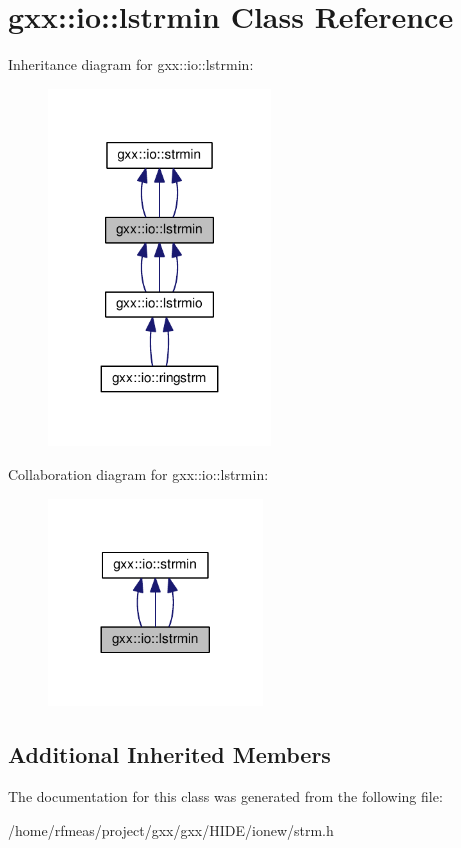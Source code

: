 \hypertarget{classgxx_1_1io_1_1lstrmin}{}\section{gxx\+:\+:io\+:\+:lstrmin Class Reference}
\label{classgxx_1_1io_1_1lstrmin}


Inheritance diagram for gxx\+:\+:io\+:\+:lstrmin\+:
\nopagebreak
\begin{figure}[H]
\begin{center}
\leavevmode
\includegraphics[width=167pt]{classgxx_1_1io_1_1lstrmin__inherit__graph}
\end{center}
\end{figure}


Collaboration diagram for gxx\+:\+:io\+:\+:lstrmin\+:
\nopagebreak
\begin{figure}[H]
\begin{center}
\leavevmode
\includegraphics[width=161pt]{classgxx_1_1io_1_1lstrmin__coll__graph}
\end{center}
\end{figure}
\subsection*{Additional Inherited Members}


The documentation for this class was generated from the following file\+:\begin{DoxyCompactItemize}
\item 
/home/rfmeas/project/gxx/gxx/\+H\+I\+D\+E/ionew/strm.\+h\end{DoxyCompactItemize}
